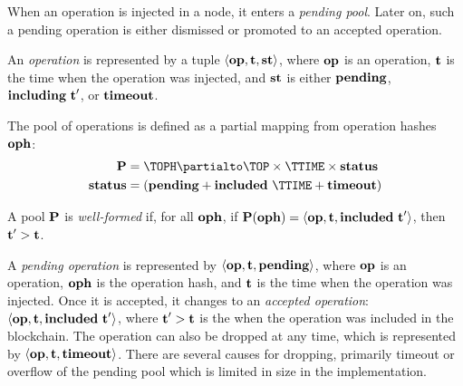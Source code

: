 \documentclass[a4paper]{llncs}
\begin{document}
When an operation is injected in a node, it enters a \emph{pending
  pool}. Later on, such a pending operation is either dismissed or
promoted to an accepted operation.

 \begin{definition}%
An \emph{operation} is represented by a tuple  $\langle  \textbf{op}, \textbf{t}, \textbf{st}
\rangle $, where $\textbf{op}$ is an operation, $\textbf{t}$ is the time when the
operation was injected, and $\textbf{st}$ is either $\textbf{pending}$,
$\textbf{including}\ \textbf{t}'$, or $\textbf{timeout}$.  
\end{definition}
\begin{definition}
  The pool of operations is defined as a partial mapping from
  operation hashes $\textbf{oph}$:
  \begin{align*}
    \PENDING &= \TOPH \partialto \TOP\times \TTIME \times \TSTATUS \\
    \TSTATUS&= (\STATUSPENDING + \STATUSINCLUDED\ \TTIME + \STATUSTIMEOUT)
  \end{align*}
  
  A pool $\textbf{P}$ is \emph{well-formed} if, for all $\textbf{oph}$, if $\textbf{P} (\textbf{oph}) =
  \langle\textbf{op},\textbf{t}, \textbf{included}\ \textbf{t}'\rangle$, 
  then $\textbf{t}' > \textbf{t}$.
\end{definition}


A \emph{pending operation} is represented by
$\langle  \textbf{op}, \textbf{t}, \textbf{pending}\rangle $,
where $\textbf{op}$ is an operation, $\textbf{oph}$ is the operation hash,
and $\textbf{t}$ is the time when the operation was injected.
Once it is accepted, it changes to an \emph{accepted operation}:
$\langle  \textbf{op}, \textbf{t}, \textbf{included}\ \textbf{t}'\rangle $, where
$\textbf{t}'> \textbf{t}$ is the  when the operation was included in the
blockchain.  The operation can also be dropped at any time, which is
represented by
$\langle  \textbf{op}, \textbf{t}, \textbf{timeout}\rangle $. There are several
causes for dropping, primarily timeout or overflow of the pending
pool which is limited in size in the implementation.



\end{document}
